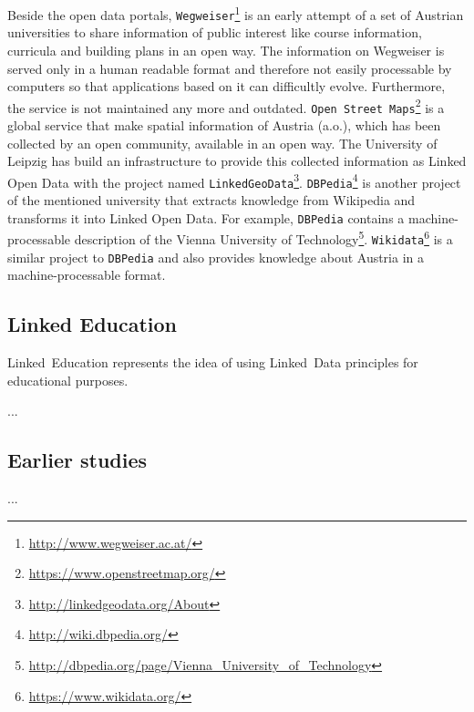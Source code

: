 \documentclass{article}
\begin{document}
Beside the open data portals, \texttt{Wegweiser}\footnote{\url{http://www.wegweiser.ac.at/}} is an early attempt of a set of Austrian universities to share information of public interest like course information, curricula and building plans in an open way. The information on Wegweiser is served only in a human readable format and therefore not easily processable by computers so that applications based on it can difficultly evolve. Furthermore, the service is not maintained any more and outdated. \texttt{Open Street Maps}\footnote{\url{https://www.openstreetmap.org/}} is a global service that make spatial information of Austria (a.o.), which has been collected by an open community, available in an open way. The University of Leipzig has build an infrastructure to provide this collected information as Linked Open Data with the project named \texttt{LinkedGeoData}\footnote{\url{http://linkedgeodata.org/About}}. \texttt{DBPedia}\footnote{\url{http://wiki.dbpedia.org/}} is another project of the mentioned university that extracts knowledge from Wikipedia and transforms it into Linked Open Data. For example, \texttt{DBPedia} contains a machine-processable description of the Vienna University of Technology\footnote{\url{http://dbpedia.org/page/Vienna_University_of_Technology}}. \texttt{Wikidata}\footnote{\url{https://www.wikidata.org/}} is a similar project to \texttt{DBPedia} and also provides knowledge about Austria in a machine-processable format. 

\subsection{Linked Education}
\label{related-work:austrian-open-data}
Linked~Education represents the idea of using Linked~Data principles for educational purposes. 

...
\subsection{Earlier studies}
\label{related-work:earlier-studies}
...

\end{document}
